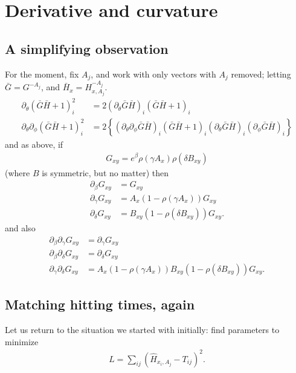 \documentclass{article}
\begin{document}
\section{Derivative and curvature}

\subsection{A simplifying observation}

For the moment, fix $A_j$, and work with only vectors with $A_j$ removed;
letting $\bar G = G^{-A_j}$, and $\bar H_x = H_{x,A_j}^{-A_j}$.
\begin{align}
  \partial_\theta ( \bar G \bar H + 1 )_i^2 &= 2 ( \partial_\theta \bar G \bar H )_i (\bar G \bar H +1)_i \\
  \partial_\theta \partial_\phi ( \bar G \bar H + 1 )_i^2 
    &= 2 \left\{ ( \partial_\theta \partial_\phi \bar G \bar H )_i (\bar G \bar H +1)_i 
      ( \partial_\theta \bar G \bar H )_i ( \partial_\phi \bar G \bar H )_i \right\}
\end{align}
and as above, if
\begin{align}
  G_{xy} = e^\beta \rho(\gamma A_x) \rho(\delta B_{xy})
\end{align}
(where $B$ is symmetric, but no matter)
then
\begin{align}
  \partial_\beta G_{xy} &= G_{xy} \\
  \partial_\gamma G_{xy} &= A_x (1-\rho(\gamma A_x)) G_{xy} \\
  \partial_\delta G_{xy} &= B_{xy} (1-\rho(\delta B_{xy})) G_{xy}  .
\end{align}
and also 
\begin{align}
  \partial_\beta \partial_\gamma G_{xy} &= \partial_\gamma G_{xy} \\
  \partial_\beta \partial_\delta G_{xy} &= \partial_\delta G_{xy} \\
  \partial_\gamma \partial_\delta G_{xy} &= A_x (1-\rho(\gamma A_x)) B_{xy} (1-\rho(\delta B_{xy})) G_{xy}  .
\end{align}


\subsection{Matching hitting times, again}

Let us return to the situation we started with initially:
find parameters to minimize
\begin{align}
  L = \sum_{ij} \left( \hat H_{x_i,A_j} - T_{ij} \right)^2 .
\end{align}
\end{document}
